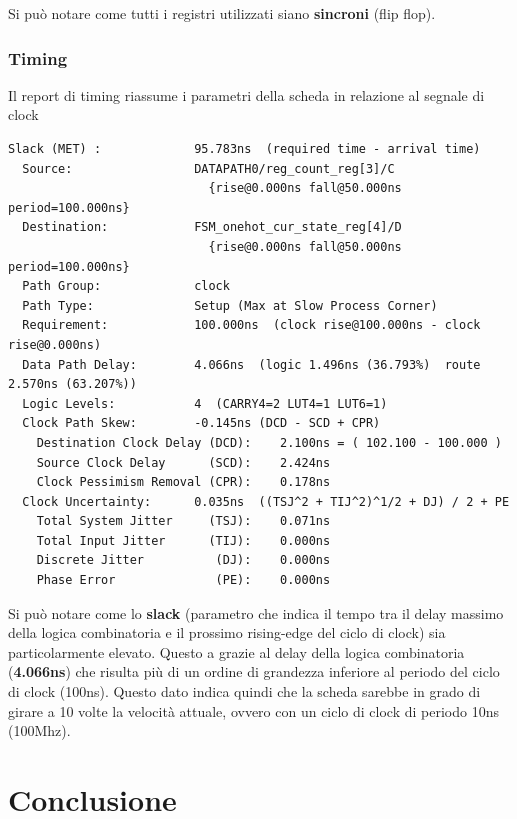 \documentclass[a4paper]{report}
\begin{document}
Si può notare come tutti i registri utilizzati siano    \textbf{sincroni} (flip flop).

\subsection{Timing}
Il report di timing riassume i parametri della scheda in relazione al segnale di clock

\begin{verbatim}
Slack (MET) :             95.783ns  (required time - arrival time)
  Source:                 DATAPATH0/reg_count_reg[3]/C
                            {rise@0.000ns fall@50.000ns period=100.000ns}
  Destination:            FSM_onehot_cur_state_reg[4]/D
                            {rise@0.000ns fall@50.000ns period=100.000ns}
  Path Group:             clock
  Path Type:              Setup (Max at Slow Process Corner)
  Requirement:            100.000ns  (clock rise@100.000ns - clock rise@0.000ns)
  Data Path Delay:        4.066ns  (logic 1.496ns (36.793%)  route 2.570ns (63.207%))
  Logic Levels:           4  (CARRY4=2 LUT4=1 LUT6=1)
  Clock Path Skew:        -0.145ns (DCD - SCD + CPR)
    Destination Clock Delay (DCD):    2.100ns = ( 102.100 - 100.000 ) 
    Source Clock Delay      (SCD):    2.424ns
    Clock Pessimism Removal (CPR):    0.178ns
  Clock Uncertainty:      0.035ns  ((TSJ^2 + TIJ^2)^1/2 + DJ) / 2 + PE
    Total System Jitter     (TSJ):    0.071ns
    Total Input Jitter      (TIJ):    0.000ns
    Discrete Jitter          (DJ):    0.000ns
    Phase Error              (PE):    0.000ns
\end{verbatim}

Si può notare come lo \textbf{slack} (parametro che indica il tempo tra il delay massimo della logica combinatoria e il prossimo rising-edge del ciclo di clock) sia particolarmente elevato. Questo a grazie al delay della logica combinatoria (\textbf{4.066ns}) che risulta più di un ordine di grandezza inferiore al periodo del ciclo di clock (100ns).
Questo dato indica quindi che la scheda sarebbe in grado di girare a 10 volte la velocità attuale, ovvero con un ciclo di clock di periodo 10ns (100Mhz).


\chapter{Conclusione}
\end{document}
